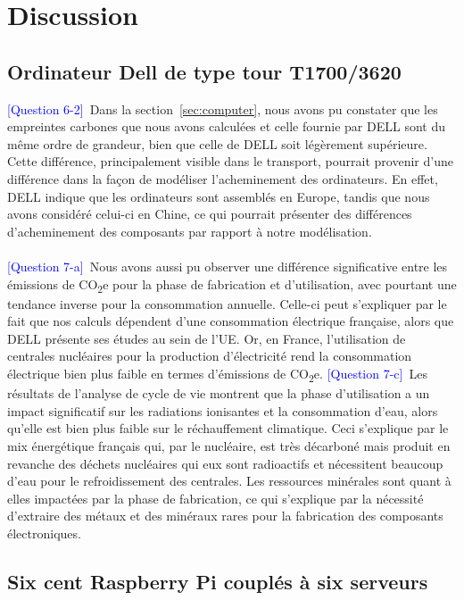 \documentclass[12pt,a4paper]{paper}
\begin{document}
\section{Discussion}
\subsection{Ordinateur Dell de type tour T1700/3620}
\textcolor{blue}{[Question 6-2]}~Dans la section~\ref{sec:computer}, nous avons pu constater que les empreintes carbones que nous avons calculées et celle fournie par DELL sont du même ordre de grandeur, bien que celle de DELL soit légèrement supérieure. Cette différence, principalement visible dans le transport, pourrait provenir d'une différence dans la façon de modéliser l'acheminement des ordinateurs. En effet, DELL indique que les ordinateurs sont assemblés en Europe, tandis que nous avons considéré celui-ci en Chine, ce qui pourrait présenter des différences d'acheminement des composants par rapport à notre modélisation.\\ \\
\textcolor{blue}{[Question 7-a]}~Nous avons aussi pu observer une différence significative entre les émissions de CO\textsubscript{2}e pour la phase de fabrication et d'utilisation, avec pourtant une tendance inverse pour la consommation annuelle. Celle-ci peut s'expliquer par le fait que nos calculs dépendent d'une consommation électrique française, alors que DELL présente ses études au sein de l'UE. Or, en France, l'utilisation de centrales nucléaires pour la production d'électricité rend la consommation électrique bien plus faible en termes d'émissions de CO\textsubscript{2}e.
\textcolor{blue}{[Question 7-c]}~Les résultats de l'analyse de cycle de vie montrent que la phase d'utilisation a un impact significatif sur les radiations ionisantes et la consommation d'eau, alors qu'elle est bien plus faible sur le réchauffement climatique. Ceci s'explique par le mix énergétique français qui, par le nucléaire, est très décarboné mais produit en revanche des déchets nucléaires qui eux sont radioactifs et nécessitent beaucoup d'eau pour le refroidissement des centrales.
Les ressources minérales sont quant à elles impactées par la phase de fabrication, ce qui s'explique par la nécessité d'extraire des métaux et des minéraux rares pour la fabrication des composants électroniques.


\subsection{Six cent Raspberry Pi couplés à six serveurs}
\end{document}

